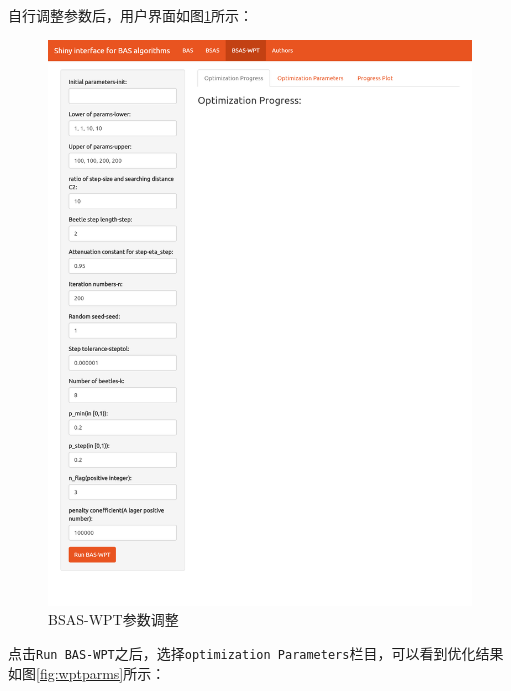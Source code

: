 \documentclass[]{ctexbook}
\newenvironment{Shaded}{\begin{snugshade}}{\end{snugshade}}
\newcommand{\KeywordTok}[1]{\textcolor[rgb]{0.13,0.29,0.53}{\textbf{#1}}}
\newcommand{\DataTypeTok}[1]{\textcolor[rgb]{0.13,0.29,0.53}{#1}}
\newcommand{\OperatorTok}[1]{\textcolor[rgb]{0.81,0.36,0.00}{\textbf{#1}}}
\newcommand{\NormalTok}[1]{#1}
\begin{document}
\begin{Shaded}
\end{Shaded}

自行调整参数后，用户界面如图\ref{fig:wpt1}所示：

\begin{figure}

{\centering \includegraphics[width=0.95\linewidth]{img/wpt1} 

}

\caption{BSAS-WPT参数调整}\label{fig:wpt1}
\end{figure}

点击\texttt{Run\ BAS-WPT}之后，选择\texttt{optimization\ Parameters}栏目，可以看到优化结果如图\ref{fig:wptparms}所示：
\end{document}
